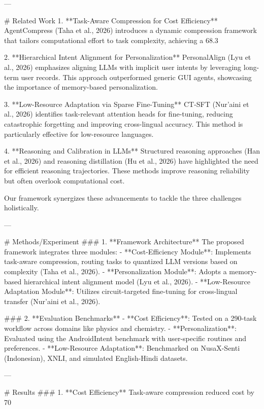---

# Related Work  
1. **Task-Aware Compression for Cost Efficiency**  
AgentCompress (Taha et al., 2026) introduces a dynamic compression framework that tailors computational effort to task complexity, achieving a 68.3%

2. **Hierarchical Intent Alignment for Personalization**  
PersonalAlign (Lyu et al., 2026) emphasizes aligning LLMs with implicit user intents by leveraging long-term user records. This approach outperformed generic GUI agents, showcasing the importance of memory-based personalization.

3. **Low-Resource Adaptation via Sparse Fine-Tuning**  
CT-SFT (Nur’aini et al., 2026) identifies task-relevant attention heads for fine-tuning, reducing catastrophic forgetting and improving cross-lingual accuracy. This method is particularly effective for low-resource languages.

4. **Reasoning and Calibration in LLMs**  
Structured reasoning approaches (Han et al., 2026) and reasoning distillation (Hu et al., 2026) have highlighted the need for efficient reasoning trajectories. These methods improve reasoning reliability but often overlook computational cost.

Our framework synergizes these advancements to tackle the three challenges holistically.

---

# Methods/Experiment  
### 1. **Framework Architecture**  
The proposed framework integrates three modules:  
- **Cost-Efficiency Module**: Implements task-aware compression, routing tasks to quantized LLM versions based on complexity (Taha et al., 2026).  
- **Personalization Module**: Adopts a memory-based hierarchical intent alignment model (Lyu et al., 2026).  
- **Low-Resource Adaptation Module**: Utilizes circuit-targeted fine-tuning for cross-lingual transfer (Nur’aini et al., 2026).  

### 2. **Evaluation Benchmarks**  
- **Cost Efficiency**: Tested on a 290-task workflow across domains like physics and chemistry.  
- **Personalization**: Evaluated using the AndroidIntent benchmark with user-specific routines and preferences.  
- **Low-Resource Adaptation**: Benchmarked on NusaX-Senti (Indonesian), XNLI, and simulated English-Hindi datasets.

---

# Results  
### 1. **Cost Efficiency**  
Task-aware compression reduced cost by 70%


